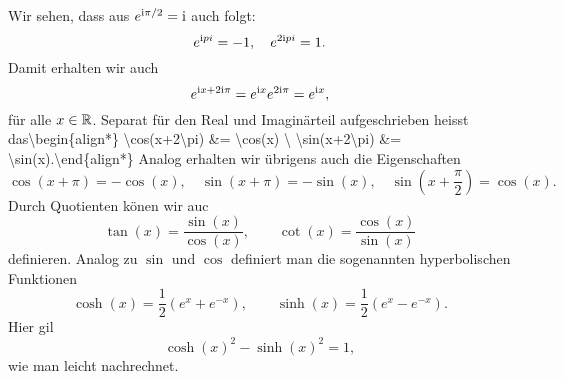 Wir sehen, dass aus \( e^{\mathrm{i} \pi/2 } = \mathrm{i}\) auch folgt:
\begin{equation*}
 e^{\mathrm{i} pi} = -1, \quad e^{2 \mathrm{i} pi} =  1.
\end{equation*}
Damit erhalten wir auch
\begin{equation*}
 e^{\mathrm{i} x + 2 \mathrm{i} \pi} = e^{\mathrm{i} x}e^{2 \mathrm{i} \pi} = e^{\mathrm{i} x},
\end{equation*}
für alle \(x \in \mathbb{R}\). Separat für den Real  und Imaginärteil aufgeschrieben heisst das\textbackslash{}begin\{align*\}
\textbackslash{}cos(x+2\textbackslash{}pi) \&= \textbackslash{}cos(x) \textbackslash{}
\textbackslash{}sin(x+2\textbackslash{}pi) \&= \textbackslash{}sin(x).\textbackslash{}end\{align*\}
Analog erhalten wir übrigens auch die Eigenschaften
\begin{equation*}
 \cos(x+ \pi) = -\cos(x) , \quad  \sin(x+\pi) = - \sin(x), \quad \sin(x+\frac{\pi}2) = \cos(x).
\end{equation*}
Durch Quotienten könen wir auc
\begin{equation*}
 \tan(x) = \frac{\sin(x)}{\cos(x)} , \qquad \cot(x) = \frac{\cos(x)}{\sin(x)}
\end{equation*}
definieren.  Analog zu \(\sin\) und \(\cos\) definiert man die sogenannten hyperbolischen Funktionen
\begin{equation*}
 \cosh(x) = \frac{1}2 (e^x+e^{-x}), \qquad \sinh(x) = \frac{1}2 (e^x-e^{-x}).
\end{equation*}
Hier gil
\begin{equation*}
 \cosh(x)^2 - \sinh(x)^2 = 1,
\end{equation*}
wie man leicht nachrechnet.


